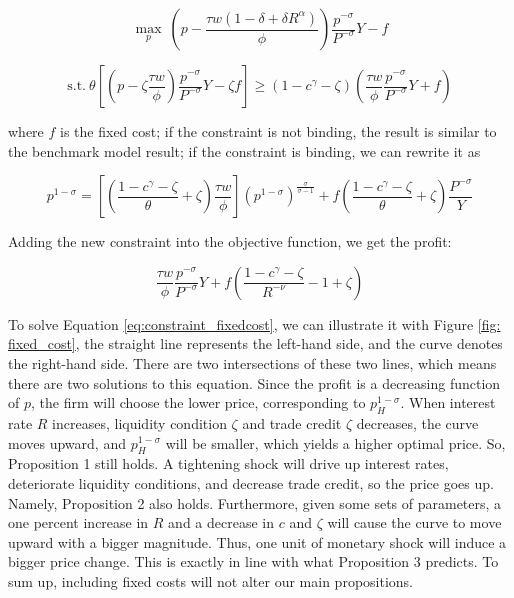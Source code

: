 $$
\max_{p} \ (p- \frac{\tau w(1-\delta+\delta R^\alpha)}{\phi}) \frac{p^{-\sigma}}{P^{-\sigma}} Y-f
$$

\begin{equation}
\text{s.t.} \ \theta [(p -\zeta \frac{\tau w}{\phi}) \frac{p^{-\sigma}}{P^{-\sigma}} Y -\zeta f ]\geq(1-c^\gamma-\zeta) (\frac{\tau w}{\phi} \frac{p^{-\sigma}}{P^{-\sigma}} Y+f)
\end{equation}

where $f$ is the fixed cost; if the constraint is not binding, the result is similar to the benchmark model result; if the constraint is binding, we can rewrite it as 

\begin{equation}\label{eq:constraint_fixedcost}
p^{1-\sigma}=[(\frac{1-c^{\gamma}-\zeta}{\theta}+\zeta)\frac{\tau w}{\phi}] (p^{1-\sigma})^{\frac{\sigma}{\sigma-1}}+f(\frac{1-c^{\gamma}-\zeta}{\theta}+\zeta)\frac{P^{-\sigma}}{Y}
\end{equation}

Adding the new constraint into the objective function, we get the profit: 

\begin{equation}
[\frac{1-c^\gamma-\zeta}{R^{-\nu}}-c^\gamma-(1-c^\gamma-\zeta)R^{\alpha}]\frac{\tau w}{\phi} \frac{p^{-\sigma}}{P^{-\sigma}}Y+f(\frac{1-c^\gamma-\zeta}{R^{-\nu}}-1+\zeta)
\end{equation}


To solve Equation \ref{eq:constraint_fixedcost}, we can illustrate it with Figure \ref{fig: fixed_cost}, the straight line represents the left-hand side, and the curve denotes the right-hand side. There are two intersections of these two lines, which means there are two solutions to this equation. Since the profit is a decreasing function of $p$, the firm will choose the lower price, corresponding to $p_H^{1-\sigma}$. When interest rate $R$ increases, liquidity condition $\zeta$ and trade credit $\zeta$ decreases, the curve moves upward, and $p_H^{1-\sigma}$ will be smaller, which yields a higher optimal price. So, Proposition 1 still holds. A tightening shock will drive up interest rates, deteriorate liquidity conditions, and decrease trade credit, so the price goes up. Namely, Proposition 2 also holds. Furthermore, given some sets of parameters, a one percent increase in $R$ and a decrease in $c$ and $\zeta$ will cause the curve to move upward with a bigger magnitude. Thus, one unit of monetary shock will induce a bigger price change. This is exactly in line with what Proposition 3 predicts. To sum up, including fixed costs will not alter our main propositions.

